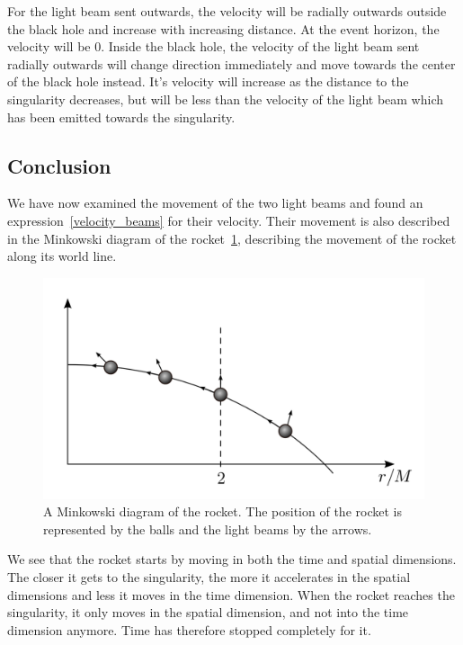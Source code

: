 \documentclass[reprint,english,notitlepage]{revtex4-2}
\begin{document}
        For the light beam sent outwards, the velocity will be radially outwards outside the black hole and increase with increasing distance.
        At the event horizon, the velocity will be 0.
        Inside the black hole, the velocity of the light beam sent radially outwards will change direction immediately and move towards the center of the black hole instead.
        It's velocity will increase as the distance to the singularity decreases, but will be less than the velocity of the light beam which has been emitted towards the singularity.


    \subsection{Conclusion}\label{subsec:conclusion7}
        We have now examined the movement of the two light beams and found an expression~\eqref{velocity_beams} for their velocity.
        Their movement is also described in the Minkowski diagram of the rocket~\ref{fig:world_line}, describing the movement of the rocket along its world line.

        \begin{figure}[h]
            \centering
            \includegraphics[scale=0.2]{world_line}
            \caption{A Minkowski diagram of the rocket. The position of the rocket is represented by the balls and the light beams by the arrows.}\label{fig:world_line}
        \end{figure}

        We see that the rocket starts by moving in both the time and spatial dimensions.
        The closer it gets to the singularity, the more it accelerates in the spatial dimensions and less it moves in the time dimension.
        When the rocket reaches the singularity, it only moves in the spatial dimension, and not into the time dimension anymore.
        Time has therefore stopped completely for it.\\
\end{document}
